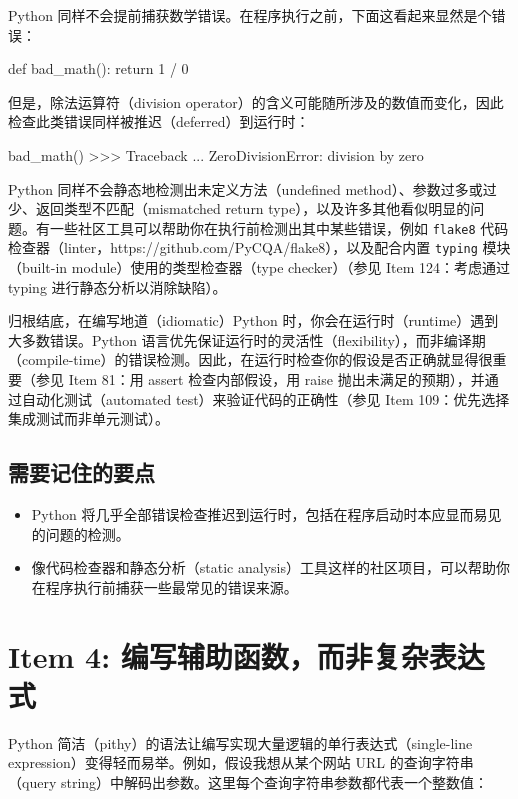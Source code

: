 Python 同样不会提前捕获数学错误。在程序执行之前，下面这看起来显然是个错误：

\begin{codebox}[python]
def bad_math():
    return 1 / 0
\end{codebox}

但是，除法运算符（division operator）的含义可能随所涉及的数值而变化，因此检查此类错误同样被推迟（deferred）到运行时：

\begin{codebox}[python]
bad_math()
>>>
Traceback ...
ZeroDivisionError: division by zero
\end{codebox}

Python 同样不会静态地检测出未定义方法（undefined method）、参数过多或过少、返回类型不匹配（mismatched return type），以及许多其他看似明显的问题。有一些社区工具可以帮助你在执行前检测出其中某些错误，例如 \texttt{flake8} 代码检查器（linter，https://github.com/PyCQA/flake8），以及配合内置 \texttt{typing} 模块（built-in module）使用的类型检查器（type checker）（参见 Item 124：考虑通过 typing 进行静态分析以消除缺陷）。

归根结底，在编写地道（idiomatic）Python 时，你会在运行时（runtime）遇到大多数错误。Python 语言优先保证运行时的灵活性（flexibility），而非编译期（compile-time）的错误检测。因此，在运行时检查你的假设是否正确就显得很重要（参见 Item 81：用 assert 检查内部假设，用 raise 抛出未满足的预期），并通过自动化测试（automated test）来验证代码的正确性（参见 Item 109：优先选择集成测试而非单元测试）。

\subsection{需要记住的要点}

\begin{itemize}
\item Python 将几乎全部错误检查推迟到运行时，包括在程序启动时本应显而易见的问题的检测。
\item 像代码检查器和静态分析（static analysis）工具这样的社区项目，可以帮助你在程序执行前捕获一些最常见的错误来源。
\end{itemize}

\section{Item 4: 编写辅助函数，而非复杂表达式}

Python 简洁（pithy）的语法让编写实现大量逻辑的单行表达式（single-line expression）变得轻而易举。例如，假设我想从某个网站 URL 的查询字符串（query string）中解码出参数。这里每个查询字符串参数都代表一个整数值：

